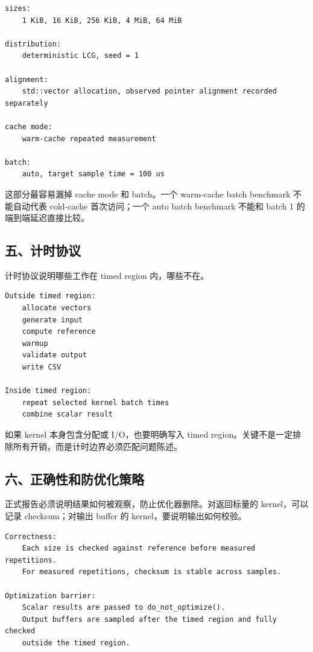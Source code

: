 \begin{lstlisting}
sizes:
    1 KiB, 16 KiB, 256 KiB, 4 MiB, 64 MiB

distribution:
    deterministic LCG, seed = 1

alignment:
    std::vector allocation, observed pointer alignment recorded separately

cache mode:
    warm-cache repeated measurement

batch:
    auto, target sample time = 100 us
\end{lstlisting}

这部分最容易漏掉 cache mode 和 batch。一个 warm-cache batch benchmark 不能自动代表 cold-cache 首次访问；一个 auto batch benchmark 不能和 batch 1 的端到端延迟直接比较。

\subsection{五、计时协议}

计时协议说明哪些工作在 timed region 内，哪些不在。

\begin{lstlisting}
Outside timed region:
    allocate vectors
    generate input
    compute reference
    warmup
    validate output
    write CSV

Inside timed region:
    repeat selected kernel batch times
    combine scalar result
\end{lstlisting}

如果 kernel 本身包含分配或 I/O，也要明确写入 timed region。关键不是一定排除所有开销，而是计时边界必须匹配问题陈述。

\subsection{六、正确性和防优化策略}

正式报告必须说明结果如何被观察，防止优化器删除。对返回标量的 kernel，可以记录 checksum；对输出 buffer 的 kernel，要说明输出如何校验。

\begin{lstlisting}
Correctness:
    Each size is checked against reference before measured repetitions.
    For measured repetitions, checksum is stable across samples.

Optimization barrier:
    Scalar results are passed to do_not_optimize().
    Output buffers are sampled after the timed region and fully checked
    outside the timed region.
\end{lstlisting}

